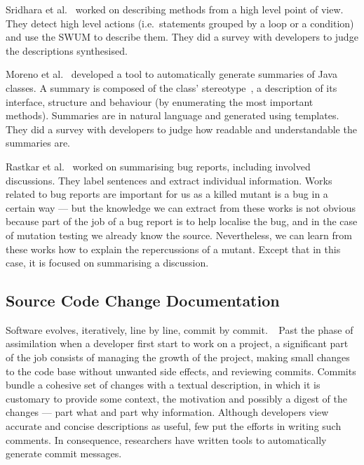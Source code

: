 \documentclass[a4paper,11pt]{sdm_internship}
\newcommand{\rephrase}[1]{\colorbox{BlueViolet!60}{\textcolor{white}{\textbf{$\sim$#1}}}}
\theoremstyle{definition}
\begin{document}
Sridhara et al.~\cite{sridhara2011automatically} worked on describing methods from a high level point of view.
They detect high level actions (i.e.\ statements grouped by a loop or a condition) and use the SWUM to describe them.
They did a survey with developers to judge the descriptions synthesised.

Moreno et al.~\cite{moreno2013automatic} developed a tool to automatically generate summaries of Java classes.
A summary is composed of the class' stereotype~\cite{moreno2012jstereocode}, a description of its interface, structure and behaviour (by enumerating the most important methods).
Summaries are in natural language and generated using templates.
They did a survey with developers to judge how readable and understandable the summaries are.

Rastkar et al.~\cite{rastkar2010summarizing} worked on summarising bug reports, including involved discussions.
They label sentences and extract individual information.
Works related to bug reports are important for us as a killed mutant is a bug in a certain way --- but the knowledge we can extract from these works is not obvious because part of the job of a bug report is to help localise the bug, and in the case of mutation testing we already know the source.
Nevertheless, we can learn from these works how to explain the repercussions of a mutant.
Except that in this case, it is focused on summarising a discussion.\rephrase{}

\subsection{Source Code Change Documentation}%
\label{ssec:commit_generation}
Software evolves, iteratively, line by line, commit by commit.\rephrase{}
Past the phase of assimilation when a developer first start to work on a project, a significant part of the job consists of managing the growth of the project, making small changes to the code base without unwanted side effects, and reviewing commits.
Commits bundle a cohesive set of changes with a textual description, in which it is customary to provide some context, the motivation and possibly a digest of the changes --- part what and part why information.
Although developers view accurate and concise descriptions as useful, few put the efforts in writing such comments.
In consequence, researchers have written tools to automatically generate commit messages.
\end{document}
